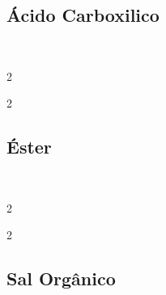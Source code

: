 \documentclass[\mainfilename]{subfiles}
\begin{document}
\begin{exampleBox}
\begin{multicols}{2}
    \end{multicols}

    \subsection*{Ácido Carboxilico}\\
    \vspace{-4ex}
    \begin{multicols}{2}
    
        \begin{exampleBox}2{}\centering
            \\
        \end{exampleBox}
    
        \begin{exampleBox}2{}\centering
            \\
        \end{exampleBox}
    
    \end{multicols}
        
    \subsection*{Éster}\\
    \vspace{-4ex}
    \begin{multicols}{2}
    
        \begin{exampleBox}2{}\centering
            \\
        \end{exampleBox}
    
        \begin{exampleBox}2{}\centering
            \\
        \end{exampleBox}
    
    \end{multicols}

    \subsection*{Sal Orgânico}\\
    \vspace{-4ex}
    \begin{multicols}{2}
    

\end{multicols}
\end{exampleBox}
\end{document}
